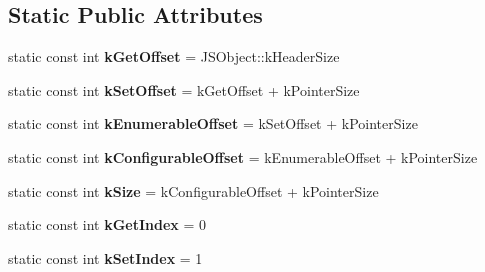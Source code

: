 \subsection*{Static Public Attributes}
\begin{DoxyCompactItemize}
\item 
static const int {\bfseries k\+Get\+Offset} = J\+S\+Object\+::k\+Header\+Size\hypertarget{classv8_1_1internal_1_1_j_s_accessor_property_descriptor_acc35936a81ef289e8802672dd99ad0a8}{}\label{classv8_1_1internal_1_1_j_s_accessor_property_descriptor_acc35936a81ef289e8802672dd99ad0a8}

\item 
static const int {\bfseries k\+Set\+Offset} = k\+Get\+Offset + k\+Pointer\+Size\hypertarget{classv8_1_1internal_1_1_j_s_accessor_property_descriptor_a3ccf2839f201d380a649b44a9b768cc8}{}\label{classv8_1_1internal_1_1_j_s_accessor_property_descriptor_a3ccf2839f201d380a649b44a9b768cc8}

\item 
static const int {\bfseries k\+Enumerable\+Offset} = k\+Set\+Offset + k\+Pointer\+Size\hypertarget{classv8_1_1internal_1_1_j_s_accessor_property_descriptor_a6d46a47185ab9ef0220ad93d878e65d1}{}\label{classv8_1_1internal_1_1_j_s_accessor_property_descriptor_a6d46a47185ab9ef0220ad93d878e65d1}

\item 
static const int {\bfseries k\+Configurable\+Offset} = k\+Enumerable\+Offset + k\+Pointer\+Size\hypertarget{classv8_1_1internal_1_1_j_s_accessor_property_descriptor_a9806e9203c48500eb99ad5bfca49e4fb}{}\label{classv8_1_1internal_1_1_j_s_accessor_property_descriptor_a9806e9203c48500eb99ad5bfca49e4fb}

\item 
static const int {\bfseries k\+Size} = k\+Configurable\+Offset + k\+Pointer\+Size\hypertarget{classv8_1_1internal_1_1_j_s_accessor_property_descriptor_a62f9633c69a802ef111bb13a3843daef}{}\label{classv8_1_1internal_1_1_j_s_accessor_property_descriptor_a62f9633c69a802ef111bb13a3843daef}

\item 
static const int {\bfseries k\+Get\+Index} = 0\hypertarget{classv8_1_1internal_1_1_j_s_accessor_property_descriptor_aeae1aa548bee1c4181760ba59023cf75}{}\label{classv8_1_1internal_1_1_j_s_accessor_property_descriptor_aeae1aa548bee1c4181760ba59023cf75}

\item 
static const int {\bfseries k\+Set\+Index} = 1\hypertarget{classv8_1_1internal_1_1_j_s_accessor_property_descriptor_a1d2760756e8cfdb9de27aa094fbe52ab}{}\label{classv8_1_1internal_1_1_j_s_accessor_property_descriptor_a1d2760756e8cfdb9de27aa094fbe52ab}


\end{DoxyCompactItemize}

